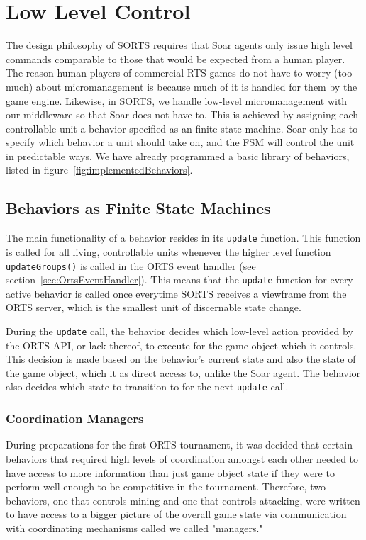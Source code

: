 
\section{Low Level Control}

The design philosophy of SORTS requires that Soar agents only issue high
level commands comparable to those that would be expected from a human
player. The reason human players of commercial RTS games do not have to
worry (too much) about micromanagement is because much of it is handled
for them by the game engine. Likewise, in SORTS, we handle low-level
micromanagement with our middleware so that Soar does not have to. This
is achieved by assigning each controllable unit a behavior specified
as an finite state machine. Soar only has to specify which behavior a
unit should take on, and the FSM will control the unit in predictable
ways. We have already programmed a basic library of behaviors, listed in
figure~\ref{fig:implementedBehaviors}.

\subsection{Behaviors as Finite State Machines}

The main functionality of a behavior resides in its {\tt update}
function. This function is called for all living, controllable units
whenever the higher level function \verb|updateGroups()| is called in
the ORTS event handler (see section~\ref{sec:OrtsEventHandler}). This
means that the {\tt update} function for every active behavior is called
once everytime SORTS receives a viewframe from the ORTS server, which is
the smallest unit of discernable state change.

During the {\tt update} call, the behavior decides which low-level action
provided by the ORTS API, or lack thereof, to execute for the game
object which it controls. This decision is made based on the behavior's
current state and also the state of the game object, which it as direct
access to, unlike the Soar agent. The behavior also decides which state
to transition to for the next {\tt update} call.

\subsubsection{Coordination Managers}

During preparations for the first ORTS tournament, it was decided that
certain behaviors that required high levels of coordination amongst
each other needed to have access to more information than just game
object state if they were to perform well enough to be competitive in
the tournament. Therefore, two behaviors, one that controls mining and
one that controls attacking, were written to have access to a bigger
picture of the overall game state via communication with coordinating
mechanisms called we called "managers."

